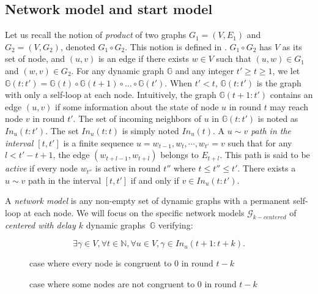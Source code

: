 \documentclass[11pt,letterpaper]{article}
\newcommand{\cent}{\gamma}
\begin{document}
\subsection{Network model and start model}

Let us recall the notion of \textit{product} of two graphs $G_1 = (V, E_1)$ and $G_2 = (V, G_2)$, denoted $G_1 \circ G_2$. This notion is defined in \cite{CBM19}.
$G_1 \circ G_2$ has $V$ as its set of node, and $(u,v)$ is an edge if there exists $w \in V$ such that $(u,w) \in G_1$ and $(w,v) \in G_2$.
For any dynamic graph $\mathds{G}$ and any integer $t' \geq t \geq 1$, we let $\mathds{G}(t:t') = \mathds{G}(t) \circ \mathds{G}(t+1) \circ \dots \circ \mathds{G}(t')$.
When $t' < t$, $\mathds{G}(t:t')$ is the graph with only a self-loop at each node.
Intuitively, the graph $\mathds{G}(t+1:t')$ contains an edge $(u,v)$ if some information about the state of node $u$ in round $t$ may reach node $v$ in round $t'$.
The set of incoming neighbors of $u$ in $\mathds{G}(t:t')$ is noted as $In_u(t:t')$.
The set $In_u(t:t)$ is simply noted $In_u(t)$.
A \textit{$u \sim v$ path in the interval $[t,t']$} is a finite sequence $u = w_{t-1}, w_t, \cdots, w_{t'} = v$
such that for any $l < t'-t+1$, the edge $(w_{t+l-1},w_{t+l})$ belongs to $E_{t+l}$.
This path is said to be \textit{active} if every node $w_{t''}$ is active in round $t''$ where $t \leq t'' \leq t'$.
There exists a $u \sim v$ path in the interval $[t,t']$ if and only if $v \in In_u(t:t')$.

A \emph{network model} is any non-empty set of dynamic graphs with a permanent self-loop at each node.
We will focus on the specific network models $\mathcal{G}_{k-centered}$ of \emph{centered with delay $k$} dynamic graphs~$\mathds{G}$ verifying: 

$$\exists \cent \in V, \forall t \in \mathds{N}, \forall u \in V, \cent \in In_u(t+1:t+k).$$

\begin{figure}[h]
    \centering
    \def\svgwidth{0.7\columnwidth}
	
	\caption{case where every node is congruent to 0 in round $t-k$}
	\label{fig:fig1}
\end{figure}

\begin{figure}[h]
    \centering
    \def\svgwidth{0.7\columnwidth}
	
	\caption{case where some nodes are not congruent to 0 in round $t-k$}
	\label{fig:fig2}
\end{figure}
\end{document}
